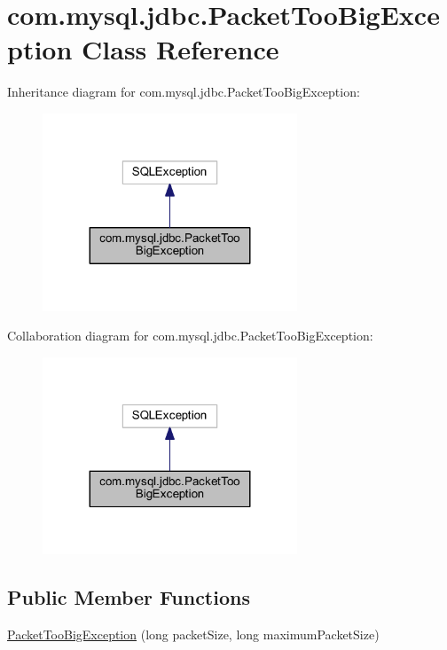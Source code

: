\hypertarget{classcom_1_1mysql_1_1jdbc_1_1_packet_too_big_exception}{}\section{com.\+mysql.\+jdbc.\+Packet\+Too\+Big\+Exception Class Reference}
\label{classcom_1_1mysql_1_1jdbc_1_1_packet_too_big_exception}


Inheritance diagram for com.\+mysql.\+jdbc.\+Packet\+Too\+Big\+Exception\+:
\nopagebreak
\begin{figure}[H]
\begin{center}
\leavevmode
\includegraphics[width=215pt]{classcom_1_1mysql_1_1jdbc_1_1_packet_too_big_exception__inherit__graph}
\end{center}
\end{figure}


Collaboration diagram for com.\+mysql.\+jdbc.\+Packet\+Too\+Big\+Exception\+:
\nopagebreak
\begin{figure}[H]
\begin{center}
\leavevmode
\includegraphics[width=215pt]{classcom_1_1mysql_1_1jdbc_1_1_packet_too_big_exception__coll__graph}
\end{center}
\end{figure}
\subsection*{Public Member Functions}
\begin{DoxyCompactItemize}
\item 
\mbox{\hyperlink{classcom_1_1mysql_1_1jdbc_1_1_packet_too_big_exception_a8a7ea4d7d32d6f99f7ded58af204d5f1}{Packet\+Too\+Big\+Exception}} (long packet\+Size, long maximum\+Packet\+Size)
\end{DoxyCompactItemize}


